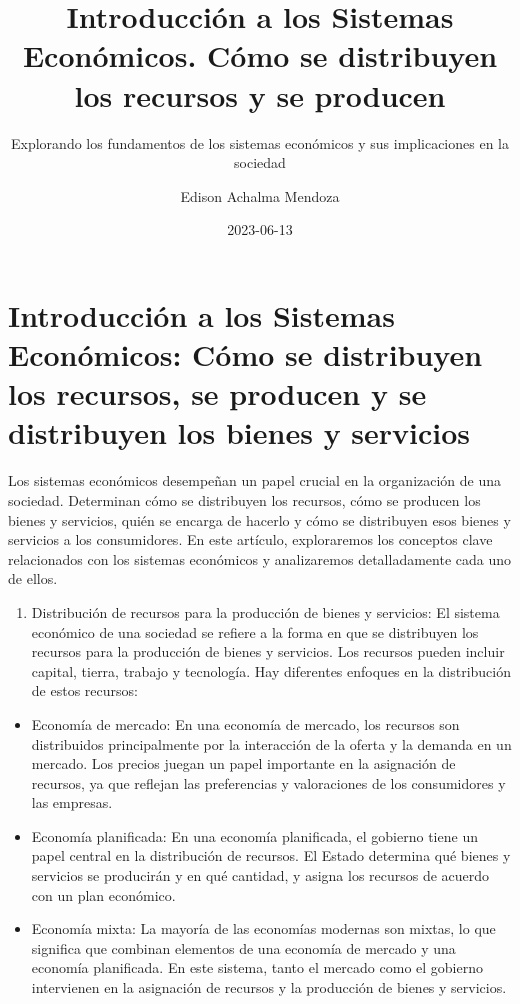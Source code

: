\documentclass[
  letterpaper,
  DIV=11,
  numbers=noendperiod]{scrartcl}
\title{Introducción a los Sistemas Económicos. Cómo se distribuyen los
recursos y se producen}
\subtitle{Explorando los fundamentos de los sistemas económicos y sus
implicaciones en la sociedad}
\author{Edison Achalma Mendoza}
\date{2023-06-13}
\providecommand{\tightlist}{%
  \setlength{\itemsep}{0pt}\setlength{\parskip}{0pt}}\usepackage{longtable,booktabs,array}
\begin{document}
\maketitle
\ifdefined\Shaded\renewenvironment{Shaded}{\begin{tcolorbox}[sharp corners, borderline west={3pt}{0pt}{shadecolor}, breakable, interior hidden, enhanced, frame hidden, boxrule=0pt]}{\end{tcolorbox}}\fi

\hypertarget{introducciuxf3n-a-los-sistemas-econuxf3micos-cuxf3mo-se-distribuyen-los-recursos-se-producen-y-se-distribuyen-los-bienes-y-servicios}{%
\section{Introducción a los Sistemas Económicos: Cómo se distribuyen los
recursos, se producen y se distribuyen los bienes y
servicios}\label{introducciuxf3n-a-los-sistemas-econuxf3micos-cuxf3mo-se-distribuyen-los-recursos-se-producen-y-se-distribuyen-los-bienes-y-servicios}}

Los sistemas económicos desempeñan un papel crucial en la organización
de una sociedad. Determinan cómo se distribuyen los recursos, cómo se
producen los bienes y servicios, quién se encarga de hacerlo y cómo se
distribuyen esos bienes y servicios a los consumidores. En este
artículo, exploraremos los conceptos clave relacionados con los sistemas
económicos y analizaremos detalladamente cada uno de ellos.

\begin{enumerate}
\def\labelenumi{\arabic{enumi}.}
\tightlist
\item
  Distribución de recursos para la producción de bienes y servicios: El
  sistema económico de una sociedad se refiere a la forma en que se
  distribuyen los recursos para la producción de bienes y servicios. Los
  recursos pueden incluir capital, tierra, trabajo y tecnología. Hay
  diferentes enfoques en la distribución de estos recursos:
\end{enumerate}

\begin{itemize}
\item
  Economía de mercado: En una economía de mercado, los recursos son
  distribuidos principalmente por la interacción de la oferta y la
  demanda en un mercado. Los precios juegan un papel importante en la
  asignación de recursos, ya que reflejan las preferencias y
  valoraciones de los consumidores y las empresas.
\item
  Economía planificada: En una economía planificada, el gobierno tiene
  un papel central en la distribución de recursos. El Estado determina
  qué bienes y servicios se producirán y en qué cantidad, y asigna los
  recursos de acuerdo con un plan económico.
\item
  Economía mixta: La mayoría de las economías modernas son mixtas, lo
  que significa que combinan elementos de una economía de mercado y una
  economía planificada. En este sistema, tanto el mercado como el
  gobierno intervienen en la asignación de recursos y la producción de
  bienes y servicios.
\end{itemize}
\end{document}
